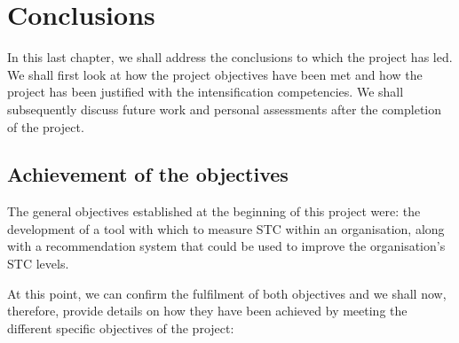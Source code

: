 \chapter{Conclusions}
\label{cap:conclusions}

In this last chapter, we shall address the conclusions to which the project has led. We shall first look at how the project objectives have been met and how the project has been justified with the intensification competencies. We shall subsequently discuss future work and personal assessments after the completion of the project.

\section{Achievement of the objectives}

The general objectives established at the beginning of this project were: the development of a tool with which to measure STC within an organisation, along with a recommendation system that could be used to improve the organisation's STC levels.

At this point, we can confirm the fulfilment of both objectives and we shall now, therefore, provide details on how they have been achieved by meeting the different specific objectives of the project:

